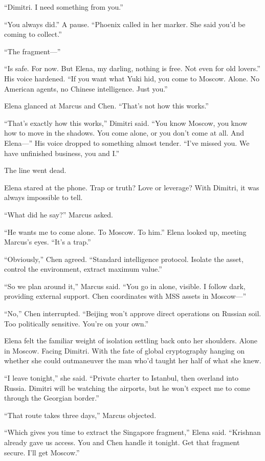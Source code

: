 ``Dimitri. I need something from you.''

``You always did.'' A pause. ``Phoenix called in her marker. She said
you'd be coming to collect.''

``The fragment---''

``Is safe. For now. But Elena, my darling, nothing is free. Not even for
old lovers.'' His voice hardened. ``If you want what Yuki hid, you come
to Moscow. Alone. No American agents, no Chinese intelligence. Just
you.''

Elena glanced at Marcus and Chen. ``That's not how this works.''

``That's exactly how this works,'' Dimitri said. ``You know Moscow, you
know how to move in the shadows. You come alone, or you don't come at
all. And Elena---'' His voice dropped to something almost tender. ``I've
missed you. We have unfinished business, you and I.''

The line went dead.

Elena stared at the phone. Trap or truth? Love or leverage? With
Dimitri, it was always impossible to tell.

``What did he say?'' Marcus asked.

``He wants me to come alone. To Moscow. To him.'' Elena looked up,
meeting Marcus's eyes. ``It's a trap.''

``Obviously,'' Chen agreed. ``Standard intelligence protocol. Isolate
the asset, control the environment, extract maximum value.''

``So we plan around it,'' Marcus said. ``You go in alone, visible. I
follow dark, providing external support. Chen coordinates with MSS
assets in Moscow---''

``No,'' Chen interrupted. ``Beijing won't approve direct operations on
Russian soil. Too politically sensitive. You're on your own.''

Elena felt the familiar weight of isolation settling back onto her
shoulders. Alone in Moscow. Facing Dimitri. With the fate of global
cryptography hanging on whether she could outmaneuver the man who'd
taught her half of what she knew.

``I leave tonight,'' she said. ``Private charter to Istanbul, then
overland into Russia. Dimitri will be watching the airports, but he
won't expect me to come through the Georgian border.''

``That route takes three days,'' Marcus objected.

``Which gives you time to extract the Singapore fragment,'' Elena said.
``Krishnan already gave us access. You and Chen handle it tonight. Get
that fragment secure. I'll get Moscow.''

